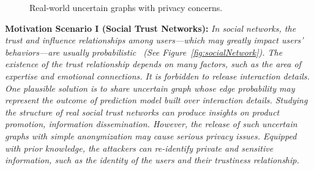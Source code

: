 \begin{figure}[!htb]
    \vspace{-3pt}
    \caption{Real-world uncertain graphs with privacy concerns.}
    \vspace{-15pt}
\end{figure}
{\textbf{Motivation Scenario I (Social Trust Networks): }}
{\em 
In social networks, the trust and influence relationships among users---which may greatly impact users' behaviors---are usually probabilistic~\cite{Kempe_Maximizing_2003} 
(See Figure~\ref{fig:socialNetwork}). The existence of the trust relationship depends on many factors, such as the area of expertise and emotional connections. 
It is forbidden to release interaction details. One plausible solution is to share uncertain graph whose edge probability may represent the outcome of prediction model built over interaction details.
Studying the structure of \emph{real} social trust networks can produce insights on product promotion, information dissemination. 
However, the release of such uncertain graphs with simple anonymization may cause serious privacy issues.
Equipped with prior knowledge, the attackers can re-identify private and sensitive information, such as the identity of the users and their trustiness relationship.
}

